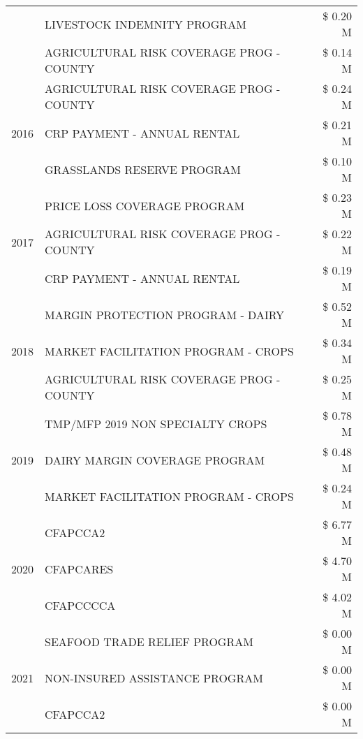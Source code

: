 \begin{tabular}{llr}
 & LIVESTOCK INDEMNITY PROGRAM & \$ 0.20 M \\
 & AGRICULTURAL RISK COVERAGE PROG - COUNTY & \$ 0.14 M \\
\cline{1-3}
\multirow[t]{3}{*}{2016} & AGRICULTURAL RISK COVERAGE PROG - COUNTY & \$ 0.24 M \\
 & CRP PAYMENT - ANNUAL RENTAL & \$ 0.21 M \\
 & GRASSLANDS RESERVE PROGRAM & \$ 0.10 M \\
\cline{1-3}
\multirow[t]{3}{*}{2017} & PRICE LOSS COVERAGE PROGRAM & \$ 0.23 M \\
 & AGRICULTURAL RISK COVERAGE PROG - COUNTY & \$ 0.22 M \\
 & CRP PAYMENT - ANNUAL RENTAL & \$ 0.19 M \\
\cline{1-3}
\multirow[t]{3}{*}{2018} & MARGIN PROTECTION PROGRAM - DAIRY & \$ 0.52 M \\
 & MARKET FACILITATION PROGRAM - CROPS & \$ 0.34 M \\
 & AGRICULTURAL RISK COVERAGE PROG - COUNTY & \$ 0.25 M \\
\cline{1-3}
\multirow[t]{3}{*}{2019} & TMP/MFP 2019 NON SPECIALTY CROPS & \$ 0.78 M \\
 & DAIRY MARGIN COVERAGE PROGRAM & \$ 0.48 M \\
 & MARKET FACILITATION PROGRAM - CROPS & \$ 0.24 M \\
\cline{1-3}
\multirow[t]{3}{*}{2020} & CFAPCCA2 & \$ 6.77 M \\
 & CFAPCARES & \$ 4.70 M \\
 & CFAPCCCCA & \$ 4.02 M \\
\cline{1-3}
\multirow[t]{3}{*}{2021} & SEAFOOD TRADE RELIEF PROGRAM & \$ 0.00 M \\
 & NON-INSURED ASSISTANCE PROGRAM & \$ 0.00 M \\
 & CFAPCCA2 & \$ 0.00 M \\
\cline{1-3}
\bottomrule
\end{tabular}
